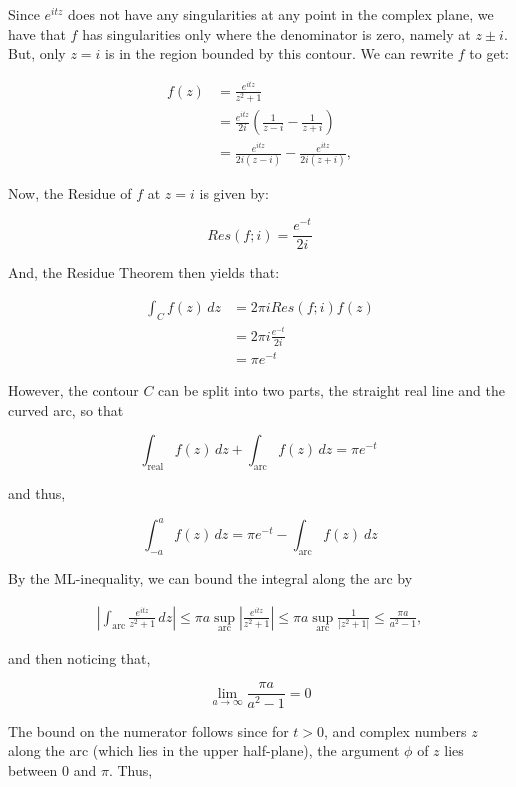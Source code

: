\documentclass[12pt, letterpaper]{article}
\begin{document}
\noindent
Since \(e^{itz}\) does not have any singularities at any point in the complex plane, we have that \(f\) has singularities only where the denominator is zero, namely at \(z \pm i \). But, only \(z = i\) is in the region bounded by this contour. We can rewrite \(f\) to get: 

\begin{align*}
f(z) &= \frac{e^{itz}}{z^2+1} \\
&=\frac{e^{itz}}{2i}\left(\frac{1}{z-i}-\frac{1}{z+i}\right) \\
&=\frac{e^{itz}}{2i(z-i)} -\frac{e^{itz}}{2i(z+i)} ,
\end{align*}

\noindent
Now, the Residue of \(f\) at \( z=i\) is given by:

\[Res(f; i) =\frac{e^{-t}}{2i}\]

\noindent
And, the Residue Theorem then yields that:

\begin{align*}
\int_C f(z)\,dz &= 2\pi iRes(f; i) f(z) \\
&=2\pi i \frac{e^{-t}}{2i} \\
&= \pi e^{-t} 
\end{align*}

\noindent
However, the contour \(C\) can be split into two parts, the straight real line and the curved arc, so that

\[\int_{\mathrm{real}} f(z)\,dz+\int_{\mathrm{arc}} f(z)\,dz=\pi e^{-t}\ \]

\noindent
and thus,

\[\int_{-a}^a f(z)\,dz =\pi e^{-t}-\int_{\mathrm{arc}} f(z)\ dz \]

\noindent
By the ML-inequality, we can bound the integral along the arc by 

\begin{align*}
\left|\int_{\mathrm{arc}}\frac{e^{itz}}{z^2+1}\,dz\right| \leq \pi a  \sup_{\text{arc}} \left| \frac{e^{itz}}{z^2+1} \right| \leq \pi a \sup_{\text{arc}} \frac{1}{|z^2+1|} \leq \frac{\pi a}{a^2 - 1},
\end{align*}

\noindent
and then noticing that, 
 
\[ \lim_{a \to \infty} \frac{\pi a}{a^2-1} = 0 \]

\noindent
The bound on the numerator follows since for \(t > 0\), and complex numbers \(z\) along the arc (which lies in the upper half-plane), the argument \( \phi \) of \( z \) lies between 0 and \(\pi \).  Thus,
\end{document}
